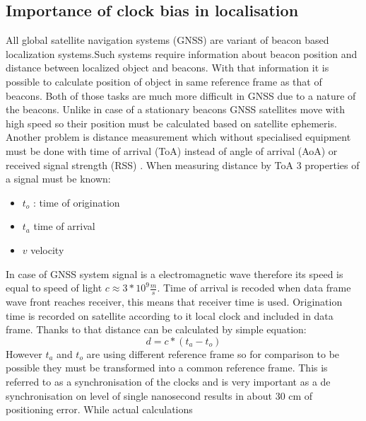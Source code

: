 \documentclass{kybernetika}
\begin{document}
\subsection{Importance of clock bias in localisation}
All global satellite navigation systems (GNSS) are variant of beacon based localization
systems\cite{Blewitt1997}.Such systems require information about beacon position
and distance between localized object and beacons.
With that information it is possible to calculate position of object in same reference
frame as that of beacons.
Both of those tasks are much more difficult in GNSS due to a nature of the beacons.
Unlike in case of a stationary beacons GNSS satellites move with high speed so
their position must be calculated based on satellite ephemeris\cite{Vallado2008}.
Another problem is distance measurement which without specialised equipment must be
done with time of arrival (ToA) instead of angle of arrival (AoA) or
received signal strength (RSS) \cite{Doberstein2012}.
When measuring distance by ToA  3 properties of a signal must be known:
\begin{itemize}
\item $t_o$ : time of origination
\item $t_a$ time of arrival
\item $v$ velocity
\end{itemize}
In case of GNSS system signal is a electromagnetic wave therefore its speed is equal
to speed of light $c\approx 3*10^{9} \frac{m}{s}$. Time of arrival is recoded when
data frame wave front reaches receiver, this means that receiver time is used.
Origination time is recorded on satellite according to it local clock and
included in data frame. Thanks to that distance can be calculated by simple
equation:
\begin{equation}
  d=c*(t_a-t_o)
\end{equation}
However $t_a$ and $t_o$ are using different reference frame so for comparison
to be possible they must be transformed into a common reference frame.
This is referred to as a synchronisation of the clocks and is very important as
a de synchronisation on level of single nanosecond results in about 30 cm of
positioning error\cite{Enge2011}.
While actual calculations 

\end{document}
